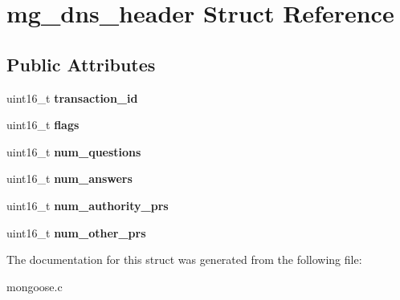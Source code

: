 \hypertarget{structmg__dns__header}{}\section{mg\+\_\+dns\+\_\+header Struct Reference}
\label{structmg__dns__header}
\subsection*{Public Attributes}
\begin{DoxyCompactItemize}
\item 
\mbox{\label{structmg__dns__header_a00963ebb1d83de6f48f7733679c4b8a7}} 
uint16\+\_\+t {\bfseries transaction\+\_\+id}
\item 
\mbox{\label{structmg__dns__header_a42a3a0530dcceaa67b96f054c1c44aa6}} 
uint16\+\_\+t {\bfseries flags}
\item 
\mbox{\label{structmg__dns__header_a156d3f5926d1fdb24bcbcba1f273c59a}} 
uint16\+\_\+t {\bfseries num\+\_\+questions}
\item 
\mbox{\label{structmg__dns__header_a2d577357775702ca340492ca51379b21}} 
uint16\+\_\+t {\bfseries num\+\_\+answers}
\item 
\mbox{\label{structmg__dns__header_a90a7621286acf1c8b78d3ee450dce9b6}} 
uint16\+\_\+t {\bfseries num\+\_\+authority\+\_\+prs}
\item 
\mbox{\label{structmg__dns__header_aed8714aa60f2cc79dc0c81378c2ddb50}} 
uint16\+\_\+t {\bfseries num\+\_\+other\+\_\+prs}
\end{DoxyCompactItemize}


The documentation for this struct was generated from the following file\+:\begin{DoxyCompactItemize}
\item 
mongoose.\+c\end{DoxyCompactItemize}
